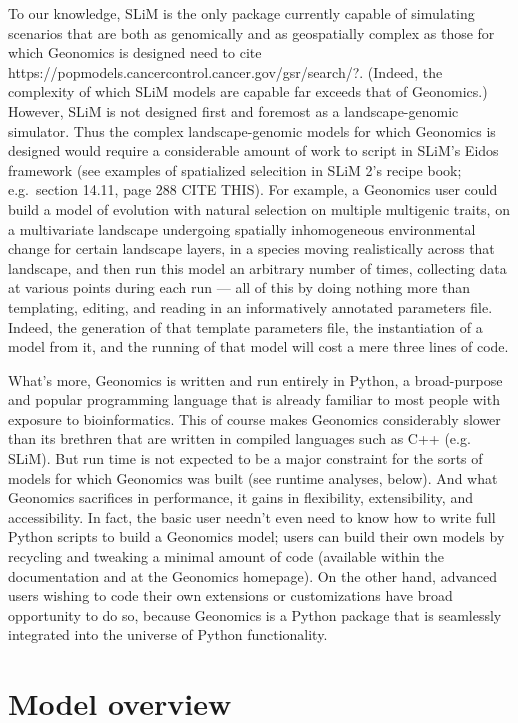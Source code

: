 ﻿\documentclass{article}
\begin{document}
To our knowledge, SLiM is the only package currently capable of simulating scenarios
that are both as genomically and as geospatially complex as those for which Geonomics is designed
{\large need to cite https://popmodels.cancercontrol.cancer.gov/gsr/search/?}.
(Indeed, the complexity of which SLiM models are capable far exceeds that of Geonomics.)
However, SLiM is not designed first and foremost as a landscape-genomic simulator.
Thus the complex landscape-genomic models for which Geonomics is designed would require
a considerable amount of work to script in SLiM's Eidos framework
(see examples of spatialized selecition in SLiM 2's recipe book;
e.g.\ section 14.11, page 288 {\large CITE THIS}).
For example, a Geonomics user could build a model of evolution with natural selection
on multiple multigenic traits, on a multivariate landscape undergoing spatially inhomogeneous
environmental change for certain landscape layers, in a species moving realistically across that landscape,
and then run this model an arbitrary number of times, collecting data at various points during each
run --- all of this by doing nothing more than templating, editing,
and reading in an informatively annotated parameters file.
Indeed, the generation of that template parameters file, the instantiation of a model from it,
and the running of that model will cost a mere three lines of code.

What's more, Geonomics is written and run entirely in Python, a broad-purpose and popular
programming language that is already familiar to most people with exposure to bioinformatics.
This of course makes Geonomics considerably slower than its brethren that are
written in compiled languages such as C++ (e.g. SLiM). 
But run time is not expected to be a major constraint for the sorts of models
for which Geonomics was built (see runtime analyses, below). 
And what Geonomics sacrifices in performance, it gains in flexibility, extensibility, and accessibility.
In fact, the basic user needn't even need to know how to write full Python scripts to 
build a Geonomics model; users can build their own models by recycling and tweaking
a minimal amount of code (available within the documentation and at the Geonomics homepage).
On the other hand, advanced users wishing to code their own extensions or customizations
have broad opportunity to do so, because Geonomics is a Python package that is seamlessly
integrated into the universe of Python functionality.


\section{Model overview}
\end{document}
